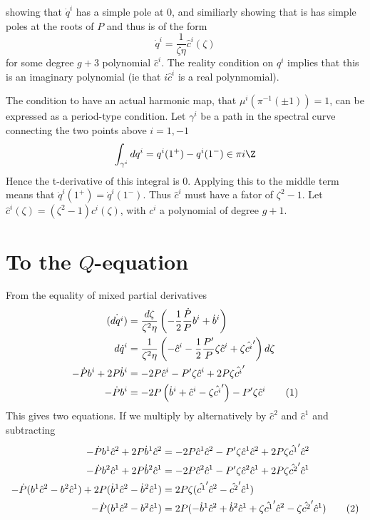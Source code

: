 \documentclass{article}
\newcommand{\labelthis}[1]{\addtocounter{equation}{1}\tag{\theequation}\label{#1}}
\begin{document}
showing that $\dot q^i$ has a simple pole at $0$, and similiarly showing that is has simple poles at the roots of $P$ and thus is of the form
\[
\dot{q}^i = \frac{1}{\zeta\eta}\hat c^i(\zeta)
\]
for some degree $g+3$ polynomial $\hat c^i$. The reality condition on $q^i$ implies that this is an imaginary polynomial (ie that $i \hat c^i$ is a real polynmomial).

The condition to have an actual harmonic map, that $\mu^i(\pi^{-1}(\pm 1)) = 1$, can be expressed as a period-type condition. Let $\gamma^i$ be a path in the spectral curve connecting the two points above $i=1,-1$
\begin{align*}
\int_{\gamma^i} dq^i = q^i(1^+) - q^i(1^-) \in \pi i \Z
\end{align*}
Hence the t-derivative of this integral is 0. Applying this to the middle term means that $\dot q^i(1^+) = \dot q^i(1^-)$. Thus $\hat c^i$ must have a fator of $\zeta^2-1$. Let $\hat c^i(\zeta) = (\zeta^2 - 1) c^i(\zeta)$, with $c^i$ a polynomial of degree $g+1$.









\chapter{To the $Q$-equation} %
\label{chp:more_stuff}
From the equality of mixed partial derivatives
\begin{align*}
\dot{(dq^i)} &= \frac{d\zeta}{\zeta^2\eta}\left( -\frac{1}{2}\frac{\dot P}{P}b^i + \dot b^i \right) \\
d\dot q^i & = \frac{1}{\zeta^2\eta}\left( -\hat c^i -\frac{1}{2}\frac{P'}{P}\zeta\hat c^i + \zeta\hat {c^i}'\right)d\zeta \\
-\dot P b^i + 2P \dot b^i & = -2P \hat c^i -P'\zeta\hat c^i + 2P\zeta\hat {c^i}' \\
-\dot P b^i &= -2P\left( \dot b^i + \hat c^i - \zeta\hat {c^i}'\right) -P'\zeta\hat c^i \labelthis{eq:EMPDi}
\end{align*}
This gives two equations. If we multiply by alternatively by $\hat c^2$ and $\hat c^1$ and subtracting
\begin{align*}
-\dot P b^1\hat c^2 + 2P \dot b^1\hat c^2 & = -2P \hat c^1\hat c^2 -P'\zeta\hat c^1\hat c^2 + 2P\zeta\hat {c^1}'\hat c^2 \\
-\dot P b^2\hat c^1 + 2P \dot b^2\hat c^1 & = -2P \hat c^2\hat c^1 -P'\zeta\hat c^2\hat c^1 + 2P\zeta\hat {c^2}'\hat c^1 \\
-\dot P (b^1\hat c^2 - b^2\hat c^1) + 2P (\dot b^1\hat c^2 - \dot b^2\hat c^1) & =  2P\zeta(\hat {c^1}'\hat c^2 - \hat {c^2}'\hat c^1) \\
-\dot P (b^1\hat c^2 - b^2\hat c^1) & =  2P(-\dot b^1\hat c^2 + \dot b^2\hat c^1 + \zeta\hat {c^1}'\hat c^2 - \zeta\hat {c^2}'\hat c^1)\labelthis{eq:diffed}
\end{align*}
\end{document}
